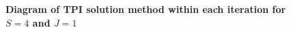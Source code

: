 \documentclass[letterpaper,12pt]{article}
\theoremstyle{definition}
\begin{document}
  \begin{figure}[htb]\centering \captionsetup{width=4.0in}
    \caption{\label{FigTPIdiag}\textbf{Diagram of TPI solution method within each iteration for $S=4$ and $J=1$}}
  \end{figure}
\end{document}
